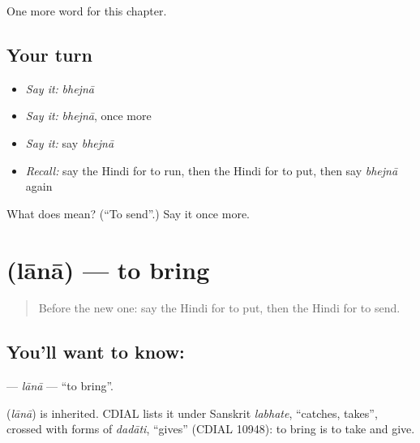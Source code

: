 \begin{grammarlens}[title={What you've built}]
One more word for this chapter.
\end{grammarlens}

\subsection*{Your turn}
\begin{itemize}
\raggedright
  \item \emph{Say it:} \emph{bhejnā}
  \item \emph{Say it:} \emph{bhejnā}, once more
  \item \emph{Say it:} say \emph{bhejnā}
  \item \emph{Recall:} say the Hindi for to run, then the Hindi for to put, then say \emph{bhejnā} again
\end{itemize}

\begin{tcolorbox}[breakable,colback=teal!4,colframe=teal!35!black,title={Before you move on}]
What does  mean? (\textquotedblleft{}To send\textquotedblright{}.) Say it once more.
\end{tcolorbox}
\section[\texorpdfstring{\hi{लाना} (lānā)}{लाना (lānā)}]{ (lānā) — to bring}

\label{lesson:HI-C160-lana}



\begin{quote}
Before the new one: say the Hindi for to put, then the Hindi for to send.
\end{quote}

\subsection*{You'll want to know: }
\textbf{} — \emph{lānā} — \textquotedblleft{}to bring\textquotedblright{}.

\begin{cousinweb}
\textbf{} (\emph{lānā}) is inherited. CDIAL lists it under Sanskrit \emph{labhate}, \textquotedblleft{}catches, takes\textquotedblright{}, crossed with forms of \emph{dadāti}, \textquotedblleft{}gives\textquotedblright{} (CDIAL 10948): to bring is to take and give.
\end{cousinweb}

